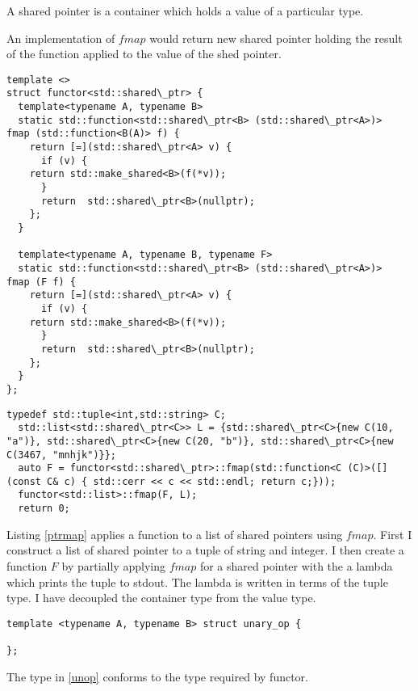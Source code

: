 \documentclass[12pt,fleqn]{article}
\begin{document}
A shared pointer is a container which holds a value of a particular type.

An implementation of $fmap$ would return new shared pointer holding the result of the function applied to the value of the shed pointer.

\begin{lstlisting}[caption=shared pointer as container, label=shp]
template <>
struct functor<std::shared\_ptr> {
  template<typename A, typename B>
  static std::function<std::shared\_ptr<B> (std::shared\_ptr<A>)>  fmap (std::function<B(A)> f) {
    return [=](std::shared\_ptr<A> v) {
      if (v) {
	return std::make_shared<B>(f(*v)); 
      }
      return  std::shared\_ptr<B>(nullptr);
    };
  }

  template<typename A, typename B, typename F>
  static std::function<std::shared\_ptr<B> (std::shared\_ptr<A>)>  fmap (F f) {
    return [=](std::shared\_ptr<A> v) {
      if (v) {
	return std::make_shared<B>(f(*v)); 
      }
      return  std::shared\_ptr<B>(nullptr);
    };
  }
};
\end{lstlisting}

\begin{lstlisting}[caption=mapping over a list of shared pointers, label=ptrmap]
  typedef std::tuple<int,std::string> C;
  std::list<std::shared\_ptr<C>> L = {std::shared\_ptr<C>{new C(10, "a")}, std::shared\_ptr<C>{new C(20, "b")}, std::shared\_ptr<C>{new C(3467, "mnhjk")}};
  auto F = functor<std::shared\_ptr>::fmap(std::function<C (C)>([](const C& c) { std::cerr << c << std::endl; return c;}));
  functor<std::list>::fmap(F, L);
  return 0;
\end{lstlisting}

Listing \ref{ptrmap} applies a function to a list of shared pointers using $fmap$.
First I construct a list of shared pointer to a tuple of string and integer.
I then create a function $F$ by partially applying $fmap$ for a shared pointer with the a lambda which prints the tuple to stdout.
The lambda is written in terms of the tuple type.
I have decoupled the container type from the value type.

\begin{lstlisting}[caption=unary operator, label=unop]
template <typename A, typename B> struct unary_op {
  
};
\end{lstlisting}

The type in \ref{unop} conforms to the type required by functor.
\end{document}

